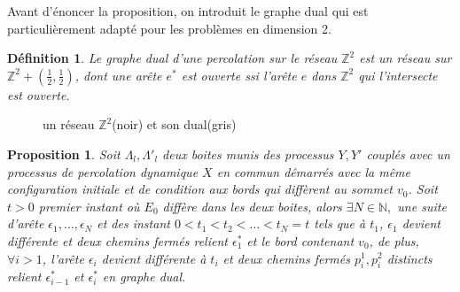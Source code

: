 \documentclass[titlepage,a4paper,11pt]{article}
\newcounter{def}
\newcounter{prop}
\newtheorem{dual}[def]{Définition}
\newtheorem{chaine}[prop]{Proposition}
\begin{document}
Avant d'énoncer la proposition, on introduit le graphe dual qui est particulièrement adapté pour les problèmes en dimension 2.
\begin{dual}
Le graphe dual d'une percolation sur le réseau $\mathbb{Z}^2$ est un réseau sur $\mathbb{Z}^2+(\frac{1}{2},\frac{1}{2})$, dont une arête $e^*$ est ouverte ssi l'arête $e$ dans $\mathbb{Z}^2$ qui l'intersecte est ouverte.
\end{dual}
\begin{figure}[h]
\center
{}
\caption{un réseau $\mathbb{Z}^2$(noir) et son dual(gris)}
\end{figure}
\begin{chaine}
\label{chaine}
Soit $\Lambda_l, \Lambda'_l$ deux boites munis des processus $Y,Y'$ couplés avec un processus de percolation dynamique $X$ en commun démarrés avec la même configuration initiale et de condition aux bords qui diffèrent au sommet $v_0$. Soit $t>0$ premier instant où $E_0$ diffère dans les deux boites, alors $\exists N\in \mathbb{N},$ une suite d'arête $\epsilon_1,\dots,\epsilon_N$ et des instant $0<t_1< t_2<\dots<t_N=t$ tels que à $t_1$, $\epsilon_1$ devient différente et deux chemins fermés relient $\epsilon_1^*$ et le bord contenant $v_0$, de plus, $\forall i>1$, l'arête $\epsilon_i$ devient différente à $t_i$ et deux chemins fermés $p_i^1,p_i^2$ distincts relient $\epsilon_{i-1}^*$ et $\epsilon_i^*$ en graphe dual.
\end{chaine}
\end{document}
